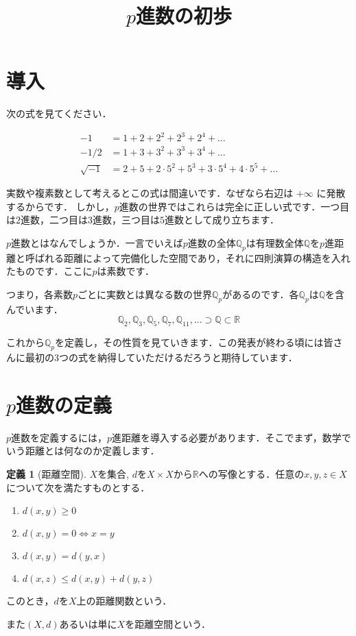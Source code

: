 \documentclass[uplatex]{jsarticle}
\newcommand{\Q}{\mathbb{Q}}
\newcommand{\R}{\mathbb{R}}
\theoremstyle{definition} %
\newtheorem{defi}[thm]{定義}
\begin{document}
\title{$p$進数の初歩}
\maketitle

\section{導入}

次の式を見てください．

\begin{align*}
-1 &= 1 + 2 + 2^2 + 2^3 + 2^4 + \dots \\
-1/2 &= 1 + 3 + 3^2 + 3^3 + 3^4 + \dots \\
\sqrt{-1} &= 2 + 5 + 2 \cdot 5^2 + 5^3 + 3 \cdot 5^4 + 4 \cdot 5^5 + \dots
\end{align*}

実数や複素数として考えるとこの式は間違いです．なぜなら右辺は $+\infty$ に発散するからです．
しかし，$p$進数の世界ではこれらは完全に正しい式です．一つ目は$2$進数，二つ目は$3$進数，三つ目は$5$進数として成り立ちます．

$p$進数とはなんでしょうか．一言でいえば$p$進数の全体$\Q_p$は有理数全体$\Q$を$p$進距離と呼ばれる距離によって完備化した空間であり，それに四則演算の構造を入れたものです．ここに$p$は素数です．

つまり，各素数$p$ごとに実数とは異なる数の世界$\Q_p$があるのです．各$\Q_p$は$\Q$を含んでいます．
\[
\Q_2, \Q_3, \Q_5, \Q_7, \Q_{11}, \dots \supset \Q \subset \mathbb{R}
\]

これから$\Q_p$を定義し，その性質を見ていきます．この発表が終わる頃には皆さんに最初の3つの式を納得していただけるだろうと期待しています．

\section{$p$進数の定義}

$p$進数を定義するには，$p$進距離を導入する必要があります．そこでまず，数学でいう距離とは何なのか定義します．

\begin{oframed}\begin{defi}[距離空間]
$X$を集合, $d$を$X \times X$から$\R$への写像とする．任意の$x, y, z \in X$について次を満たすものとする．
\begin{enumerate}
	\item $d(x, y) \geq 0$
	\item $d(x, y) = 0 \iff x = y$
	\item $d(x, y) = d(y, x)$
	\item $d(x, z) \leq d(x, y) + d(y, z)$
\end{enumerate}
このとき，$d$を$X$上の距離関数という．

また$(X, d)$あるいは単に$X$を距離空間という．
\end{defi}\end{oframed}
\end{document}

